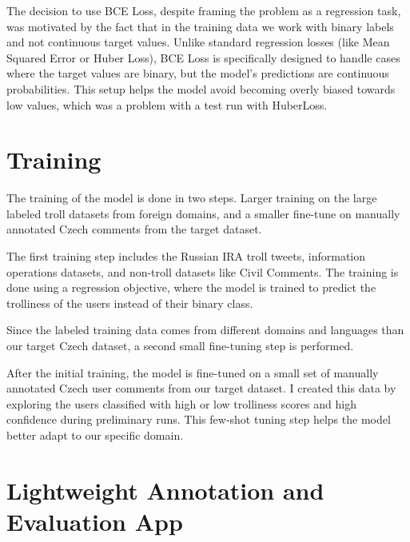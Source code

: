 \documentclass[twoside]{ctuthesis}
\theoremstyle{plain}
\theoremstyle{definition}
\theoremstyle{note}
\begin{document}
The decision to use BCE Loss, despite framing the problem as a regression task, was motivated by the fact that in the training data we work with binary labels and not continuous target values. Unlike standard regression losses (like Mean Squared Error or Huber Loss), BCE Loss is specifically designed to handle cases where the target values are binary, but the model's predictions are continuous probabilities. This setup helps the model avoid becoming overly biased towards low values, which was a problem with a test run with HuberLoss.\par 

\section{Training}
The training of the model is done in two steps. Larger training on the large labeled troll datasets from foreign domains, and a smaller fine-tune on manually annotated Czech comments from the target dataset.\par
The first training step includes the Russian IRA troll tweets, information operations datasets, and non-troll datasets like Civil Comments. The training is done using a regression objective, where the model is trained to predict the trolliness of the users instead of their binary class.\par
Since the labeled training data comes from different domains and languages than our target Czech dataset, a second small fine-tuning step is performed.\par

After the initial training, the model is fine-tuned on a small set of manually annotated Czech user comments from our target dataset. I created this data by exploring the users classified with high or low trolliness scores and high confidence during preliminary runs. This few-shot tuning step helps the model better adapt to our specific domain.\par

\section{Lightweight Annotation and Evaluation App}
\end{document}
